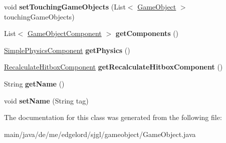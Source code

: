 \begin{DoxyCompactItemize}
\item 
\mbox{\label{classde_1_1me_1_1edgelord_1_1sjgl_1_1gameobject_1_1_game_object_a3433057c07896876674379d74c629a8e}} 
void {\bfseries set\+Touching\+Game\+Objects} (List$<$ \mbox{\hyperlink{classde_1_1me_1_1edgelord_1_1sjgl_1_1gameobject_1_1_game_object}{Game\+Object}} $>$ touching\+Game\+Objects)
\item 
\mbox{\label{classde_1_1me_1_1edgelord_1_1sjgl_1_1gameobject_1_1_game_object_a5b74e6a06d850004b4a153b1d5838c53}} 
List$<$ \mbox{\hyperlink{classde_1_1me_1_1edgelord_1_1sjgl_1_1gameobject_1_1_game_object_component}{Game\+Object\+Component}} $>$ {\bfseries get\+Components} ()
\item 
\mbox{\label{classde_1_1me_1_1edgelord_1_1sjgl_1_1gameobject_1_1_game_object_ac943a6d1be86e4381333cd0f7237353d}} 
\mbox{\hyperlink{classde_1_1me_1_1edgelord_1_1sjgl_1_1gameobject_1_1components_1_1_simple_physics_component}{Simple\+Physics\+Component}} {\bfseries get\+Physics} ()
\item 
\mbox{\label{classde_1_1me_1_1edgelord_1_1sjgl_1_1gameobject_1_1_game_object_a7b7d822e981cedc42e979041e70d9cd5}} 
\mbox{\hyperlink{classde_1_1me_1_1edgelord_1_1sjgl_1_1gameobject_1_1components_1_1_recalculate_hitbox_component}{Recalculate\+Hitbox\+Component}} {\bfseries get\+Recalculate\+Hitbox\+Component} ()
\item 
\mbox{\label{classde_1_1me_1_1edgelord_1_1sjgl_1_1gameobject_1_1_game_object_a47d015acbbdf269d2fc09be07deaf22c}} 
String {\bfseries get\+Name} ()
\item 
\mbox{\label{classde_1_1me_1_1edgelord_1_1sjgl_1_1gameobject_1_1_game_object_a990aa5133444fe6eef67c26fb8ea80d9}} 
void {\bfseries set\+Name} (String tag)
\end{DoxyCompactItemize}


The documentation for this class was generated from the following file\+:\begin{DoxyCompactItemize}
\item 
main/java/de/me/edgelord/sjgl/gameobject/Game\+Object.\+java\end{DoxyCompactItemize}
